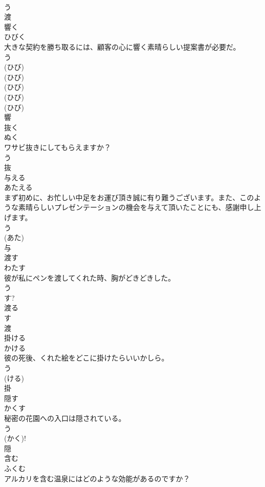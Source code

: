 \documentclass[8pt]{extreport}
\begin{document}
\begin{CJK}{UTF8}{min}
\\	う 
\\	渡	
\\	響く	
\\	ひびく	
\\	大きな契約を勝ち取るには、顧客の心に響く素晴らしい提案書が必要だ。	
\\	う 
\\	(ひび) 
\\	(ひび) 
\\	(ひび) 
\\	(ひび) 
\\	(ひび) 
\\	響	
\\	抜く	
\\	ぬく	
\\	ワサビ抜きにしてもらえますか？	
\\	う 
\\	抜	
\\	与える	
\\	あたえる	
\\	まず初めに、お忙しい中足をお運び頂き誠に有り難うございます。また、このような素晴らしいプレゼンテーションの機会を与えて頂いたことにも、感謝申し上げます。	
\\	う 
\\	(あた) 
\\	与	
\\	渡す	
\\	わたす	
\\	彼が私にペンを渡してくれた時、胸がどきどきした。	
\\	う 
\\	す? 
\\	渡る 
\\	す 
\\	渡	
\\	掛ける	
\\	かける	
\\	彼の死後、くれた絵をどこに掛けたらいいかしら。	
\\	う 
\\	(ける) 
\\	掛	
\\	隠す	
\\	かくす	
\\	秘密の花園への入口は隠されている。	
\\	う 
\\	(かく)! 
\\	隠	
\\	含む	
\\	ふくむ	
\\	アルカリを含む温泉にはどのような効能があるのですか？	

\end{CJK}
\end{document}
